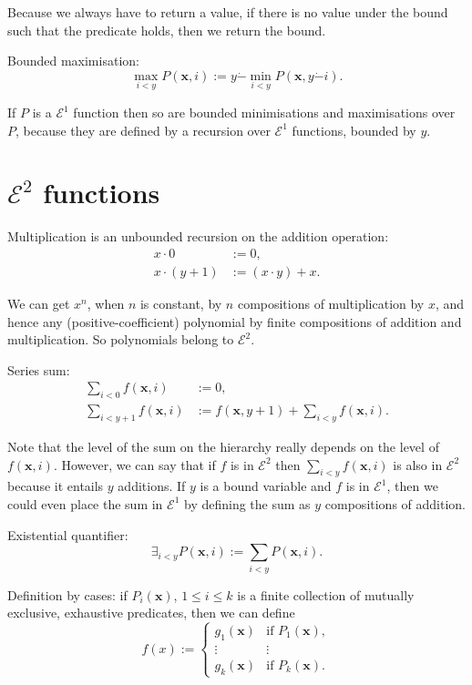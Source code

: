 \documentclass[a4paper]{article}
\newcommand{\grz}[1]{$\mathcal{E}^{#1}$}	%
\newcommand{\xvec}{\mathbf{x}}	%
\newcommand{\psub}{\dot -}	%
\newcommand{\recur}[1]{\begin{equation} \begin{split} #1 \end{split} \end{equation}}	%
\theoremstyle{plain}
\theoremstyle{definition}
\begin{document}
Because we always have to return a value, if there is no value under the bound such that the predicate holds, then we return the bound.

Bounded maximisation:
\begin{equation} \max_{i < y} P(\xvec,i) := y \psub \min_{i < y} P(\xvec, y \psub i). \end{equation}

If $P$ is a \grz{1} function then so are bounded minimisations and maximisations over $P$, because they are defined by a recursion over \grz{1} functions, bounded by $y$.

\section{\grz{2} functions}
Multiplication is an unbounded recursion on the addition operation:
\recur{
	x \cdot 0 &:= 0,				\\
	x \cdot (y+1) &:= (x \cdot y) + x.
}

We can get $x^n$, when $n$ is constant, by $n$ compositions of multiplication by $x$, and hence any (positive-coefficient) polynomial by finite compositions of addition and multiplication. So polynomials belong to \grz{2}.

Series sum:
\recur{
	\sum_{i < 0} f(\xvec, i) &:= 0,		\\
	\sum_{i < y+1} f(\xvec,i) &:= f(\xvec,y+1) + \sum_{i < y} f(\xvec,i).
}

Note that the level of the sum on the hierarchy really depends on the level of $f(\xvec,i)$. However, we can say that if $f$ is in \grz{2} then $\sum_{i < y} f(\xvec,i)$ is also in \grz{2} because it entails $y$ additions. If $y$ is a bound variable and $f$ is in \grz{1}, then we could even place the sum in \grz{1} by defining the sum as $y$ compositions of addition.

Existential quantifier:
\begin{equation} \exists_{i < y} P(\xvec,i) := \sum_{i < y} P(\xvec,i). \end{equation}


Definition by cases: if  $P_i(\xvec)$, $1 \leq i \leq k$ is a finite collection of mutually exclusive, exhaustive predicates, then we can define
\[ f(x) := \begin{cases}
	g_1(\xvec) & \textrm{if }P_1(\xvec),	\\
	\vdots & \vdots	\\
	g_k(\xvec) & \textrm{if } P_k(\xvec).
\end{cases} \]
\end{document}
